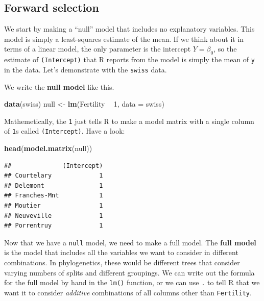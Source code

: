 \documentclass[
]{book}
\newenvironment{Shaded}{\begin{snugshade}}{\end{snugshade}}
\newcommand{\DataTypeTok}[1]{\textcolor[rgb]{0.13,0.29,0.53}{#1}}
\newcommand{\DecValTok}[1]{\textcolor[rgb]{0.00,0.00,0.81}{#1}}
\newcommand{\KeywordTok}[1]{\textcolor[rgb]{0.13,0.29,0.53}{\textbf{#1}}}
\newcommand{\NormalTok}[1]{#1}
\newcommand{\OperatorTok}[1]{\textcolor[rgb]{0.81,0.36,0.00}{\textbf{#1}}}
\newcommand{\StringTok}[1]{\textcolor[rgb]{0.31,0.60,0.02}{#1}}
\begin{document}
\hypertarget{forward-selection}{%
\subsection{Forward selection}\label{forward-selection}}

We start by making a ``null'' model that includes no explanatory variables. This model is simply a least-squares estimate of the mean. If we think about it in terms of a linear model, the only parameter is the intercept \(Y = \beta_0\), so the estimate of \texttt{(Intercept)} that R reports from the model is simply the mean of \texttt{y} in the data. Let's demonstrate with the \texttt{swiss} data.

We write the \textbf{null model} like this.

\begin{Shaded}
\begin{Highlighting}[]
\KeywordTok{data}\NormalTok{(swiss)}
\NormalTok{null <-}\StringTok{ }\KeywordTok{lm}\NormalTok{(Fertility }\OperatorTok{~}\StringTok{ }\DecValTok{1}\NormalTok{, }\DataTypeTok{data =}\NormalTok{ swiss)}
\end{Highlighting}
\end{Shaded}

Mathemetically, the \texttt{1} just tells R to make a model matrix with a single column of \texttt{1}s called \texttt{(Intercept)}. Have a look:

\begin{Shaded}
\begin{Highlighting}[]
\KeywordTok{head}\NormalTok{(}\KeywordTok{model.matrix}\NormalTok{(null))}
\end{Highlighting}
\end{Shaded}

\begin{verbatim}
##              (Intercept)
## Courtelary             1
## Delemont               1
## Franches-Mnt           1
## Moutier                1
## Neuveville             1
## Porrentruy             1
\end{verbatim}

Now that we have a \texttt{null} model, we need to make a full model. The \textbf{full model} is the model that includes all the variables we want to consider in different combinations. In phylogenetics, these would be different trees that consider varying numbers of splits and different groupings. We can write out the formula for the full model by hand in the \texttt{lm()} function, or we can use \texttt{.} to tell R that we want it to consider \emph{additive} combinations of all columns other than \texttt{Fertility}.
\end{document}

